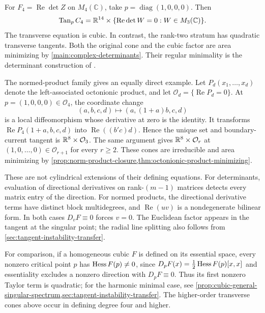 \begin{example}
\label{ex:cubic-nonvertex-tangents}
For $F_4=\operatorname{Re}\det Z$ on $M_4(\mathbb C)$, take
$p=\operatorname{diag}(1,0,0,0)$. Then
\[
 \operatorname{Tan}_p C_4=\mathbb R^{14}\times
 \{\operatorname{Re}\det W=0:W\in M_3(\mathbb C)\}.
\]
The transverse equation is cubic. In contrast, the rank-two stratum
has quadratic transverse tangents. Both the original cone and the
cubic factor are area minimizing by \cref{main:complex-determinants}.
Their regular minimality is the determinant construction of
\cite[Corollary~5.2 and Example~5.4]{HoppeTkachev19}.

The normed-product family gives an equally direct example. Let
$P_d(x_1,\ldots,x_d)$ denote the left-associated octonionic product,
and let $\mathcal O_d=\{\operatorname{Re}P_d=0\}$. At
$p=(1,0,0,0)\in\mathcal O_4$, the coordinate change
\[
 (a,b,c,d)\longmapsto(a,(1+a)b,c,d)
\]
is a local diffeomorphism whose derivative at zero is the identity.
It transforms $\operatorname{Re}P_4(1+a,b,c,d)$ into
$\operatorname{Re}((b'c)d)$. Hence the unique set and boundary-current
tangent is $\mathbb R^8\times\mathcal O_3$. The same argument gives
$\mathbb R^8\times\mathcal O_r$ at $(1,0,\ldots,0)\in\mathcal O_{r+1}$
for every $r\geq2$. These cones are irreducible and area minimizing
by \cref{prop:norm-product-closure,thm:octonionic-product-minimizing}.

These are not cylindrical extensions of their defining equations.
For determinants, evaluation of directional derivatives on
rank-$(m-1)$ matrices detects every matrix entry of the direction.
For normed products, the directional derivative terms have distinct
block multidegrees, and $\operatorname{Re}(uv)$ is a nondegenerate
bilinear form. In both cases $D_vF\equiv0$ forces $v=0$.
The Euclidean factor appears in the tangent at the singular point;
the radial line splitting also follows from
\cref{sec:tangent-instability-transfer}.
\end{example}


For comparison, if a homogeneous cubic $F$ is defined on its
essential space, every nonzero critical point $p$ has
$\operatorname{Hess} F(p)\ne0$, since $D_pF(x)=\tfrac12\operatorname{Hess} F(p)[x,x]$
and essentiality excludes a nonzero direction with $D_pF\equiv0$.
Thus its first nonzero Taylor term is quadratic; for the harmonic
minimal case, see \cref{prop:cubic-general-singular-spectrum,sec:tangent-instability-transfer}.
The higher-order transverse cones above occur in defining degree four and higher.
